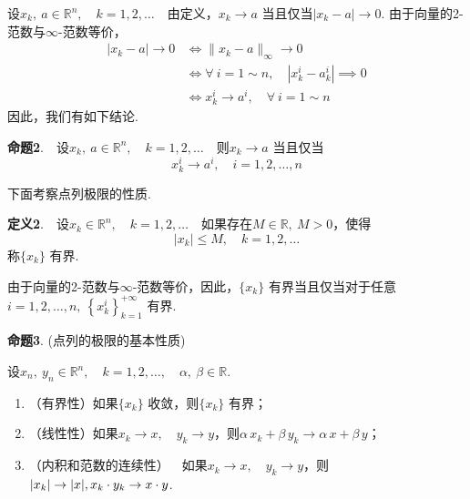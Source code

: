 \documentclass{article}
\begin{document}
\newpage

\noindent 设\(x_k,\ a \in \mathbb{R}^n,\quad k = 1,2,\dots \)\ \ 由定义，\(x_k \to a\) 当且仅当\(|x_k - a| \to 0\). 由于向量的2-范数与\(\infty \)-范数等价，
\begin{align*}
    | x_k - a |\to 0 &\iff \| x_k - a \|_{\infty }\to 0 \\
    &\iff \forall \ i = 1 \sim n,\quad | x_k^i - a_k^i | \implies 0 \\
    &\iff x_k^i \to a^i,\quad \forall\ i = 1 \sim n
\end{align*}
因此，我们有如下结论.

\vspace{20pt}

\noindent \textbf{命题2}.\ \ 设\(x_k,\ a \in \mathbb{R}^n,\quad k = 1,2,\dots \)\ \ 则\(x_k \to a\) 当且仅当
\begin{equation*}
    x_k^i \to a^i,\quad i = 1,2,\dots ,n
\end{equation*}

\newpage

\noindent 下面考察点列极限的性质.

\vspace{20pt}

\noindent \textbf{定义2}.\ \ 设\(x_k \in \mathbb{R}^n,\quad k = 1,2,\dots \)\ \ 如果存在\(M \in \mathbb{R},\ M > 0\)，使得
\begin{equation*}
    | x_k | \le M,\quad k = 1,2,\dots
\end{equation*}
称\(\{x_k\} \) 有界.
\vspace{20pt}

\noindent 由于向量的2-范数与\(\infty \)-范数等价，因此，\(\{x_k\} \) 有界当且仅当对于任意\(i = 1,2,\dots ,n,\ \left\{x_k^i\right\}_{k = 1}^{ + \infty } \) 有界.

\newpage

\noindent \textbf{命题3}. (点列的极限的基本性质)

\noindent 设\(x_n,\ y_n \in \mathbb{R}^n,\quad k = 1,2,\dots ,\quad \alpha,\ \beta \in \mathbb{R}\).
\begin{enumerate}
    \item （有界性）如果\(\{x_k\} \) 收敛，则\(\{x_k\} \) 有界；
    \item （线性性）如果\(x_k\to x,\quad y_k\to y\)，则\(\alpha\,x_k + \beta\,y_k \to \alpha\,x + \beta\,y\)；
    \item （内积和范数的连续性）\ \ 如果\(x_k \to x,\quad y_k \to y\)，则\(| x_k |\to | x |,\newline x_k \cdot y_k\to x \cdot y\).
\end{enumerate}
\end{document}
